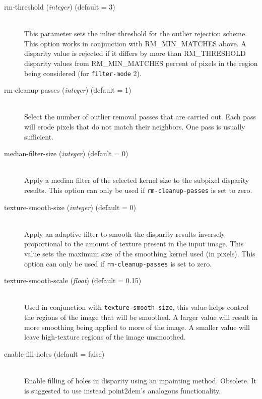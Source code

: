 \begin{description}
\item[rm-threshold \textnormal{\small{(\emph{integer})}} (default = 3)] \hfill \\
  This parameter sets the inlier threshold for the outlier rejection
  scheme.  This option works in conjunction with RM\_MIN\_MATCHES
  above.  A disparity value is rejected if it differs by more than
  RM\_THRESHOLD disparity values from RM\_MIN\_MATCHES percent of
  pixels in the region being considered  (for \texttt{filter-mode} 2).

\item[rm-cleanup-passes \textnormal{\small{(\emph{integer})}} (default = 1)] \hfill \\
  Select the number of outlier removal passes that are carried out.
  Each pass will erode pixels that do not match their neighbors.  One
  pass is usually sufficient.

\item[median-filter-size \textnormal{\small{(\emph{integer})}} (default = 0)] \hfill \\
  Apply a median filter of the selected kernel size to the subpixel disparity results.
  This option can only be used if \texttt{rm-cleanup-passes} is set to zero.

\item[texture-smooth-size \textnormal{\small{(\emph{integer})}} (default = 0)] \hfill \\
  Apply an adaptive filter to smooth the disparity results inversely proportional to
  the amount of texture present in the input image.  This value sets the maximum size 
  of the smoothing kernel used (in pixels).
  This option can only be used if \texttt{rm-cleanup-passes} is set to zero.

\item[texture-smooth-scale \textnormal{\small{(\emph{float})}} (default = 0.15)] \hfill \\
  Used in conjunction with \texttt{texture-smooth-size}, this value helps control the 
  regions of the image that will be smoothed.  A larger value will result in more 
  smoothing being applied to more of the image.  A smaller value will leave high-texture
  regions of the image unsmoothed.

\item[enable-fill-holes (default = false)] \hfill \\

Enable filling of holes in disparity using an inpainting
method. Obsolete. It is suggested to use instead point2dem's analogous
functionality.


\end{description}
